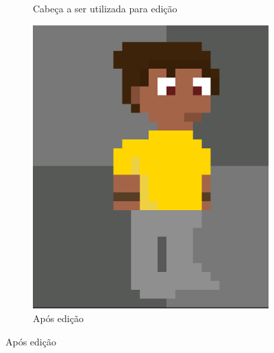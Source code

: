 \begin{figure}[htbp]
\begin{subfigure}{0.32\linewidth}
        \caption{\small Cabeça a ser utilizada para edição}
        \label{fig:pixelLabAjusteFino2b}
    \end{subfigure}
    \begin{subfigure}{0.32\linewidth}
        \centering
        \includegraphics[width=0.83\linewidth]{figs/pixelLab/dia2/fix_teste_3.PNG}
        \caption{\small Após edição}
        \label{fig:pixelLabAjusteFino2c}
    \end{subfigure}

\end{figure}

